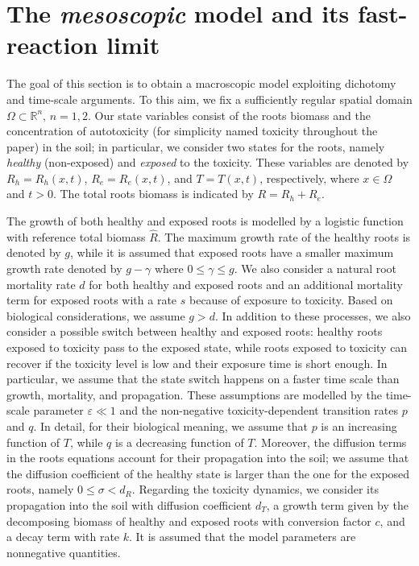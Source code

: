 \documentclass[11pt]{elsarticle}
\theoremstyle{plain}
\theoremstyle{definition}
\theoremstyle{myremark}
\begin{document}
\section{The \textit{mesoscopic} model and its fast-reaction limit}\label{sec:model}
The goal of this section is to obtain a macroscopic model exploiting dichotomy and time-scale arguments. To this aim, we fix a sufficiently regular spatial domain $\Omega \subset \mathbb{R}^n, \, n=1,2$. Our state variables consist of the roots biomass and the concentration of autotoxicity (for simplicity named toxicity throughout the paper) in the soil; in particular, we consider two states for the roots, namely \emph{healthy} (non-exposed) and \emph{exposed} to the toxicity. These variables are denoted by $R_h=R_h(x,t)$, $R_e=R_e(x,t)$, and $T=T(x,t)$, respectively, where $x\in\Omega$ and $t>0$. The total roots biomass is indicated by $R=R_h+R_e$.

The growth of both healthy and exposed roots is modelled by a logistic function with reference total biomass $\hat{R}$. The maximum growth rate of the healthy roots is denoted by $g$, while it is assumed that exposed roots have a smaller maximum growth rate denoted by $g-\gamma$ where $0\leq \gamma \leq g$. We also consider a natural root mortality rate $d$ for both healthy and exposed roots and an additional mortality term for exposed roots with a rate $s$ because of exposure to toxicity. Based on biological considerations, we assume $g>d$. In addition to these processes, we also consider a possible switch between healthy and exposed roots: healthy roots exposed to toxicity pass to the exposed state, while roots exposed to toxicity can recover if the toxicity level is low and their exposure time is short enough. In particular, we assume that the state switch happens on a faster time scale than growth, mortality, and propagation. These assumptions are modelled by the time-scale parameter $\varepsilon\ll 1$ and the non-negative toxicity-dependent transition rates $p$ and $q$. In detail, for their biological meaning, we assume that $p$ is an increasing function of $T$, while $q$ is a decreasing function of $T$. Moreover, the diffusion terms in the roots equations account for their propagation into the soil; we assume that the diffusion coefficient of the healthy state is larger than the one for the exposed roots, namely $0\leq \sigma<d_R$.
Regarding the toxicity dynamics, we consider its propagation into the soil with diffusion coefficient $d_T$, a growth term given by the decomposing biomass of healthy and exposed roots with conversion factor $c$, and a decay term with rate $k$. It is assumed that the model parameters are nonnegative quantities. 
\end{document}
